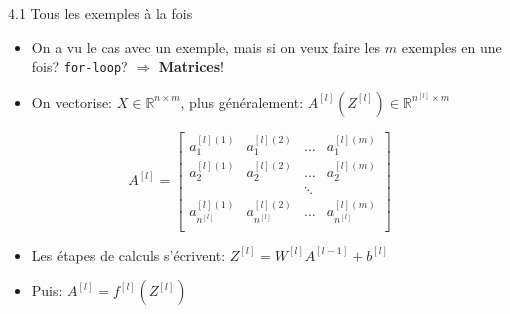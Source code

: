 \begin{frame}{4.1 Tous les exemples à la fois}
  \begin{itemize}
  \item On a vu le cas avec un exemple, mais si on veux faire les $m$ exemples en une fois? \texttt{for-loop}? $\Rightarrow$ \textbf{Matrices}!
  \item On vectorise: $X \in \mathbb{R}^{n \times m}$, plus généralement: $A^{[l]} (Z^{[l]}) \in \mathbb{R}^{n^{[l]} \times m }$
  \end{itemize}
  \begin{equation*}
    A^{[l]} = \begin{bmatrix*} a_{1}^{[l](1)} & a_{1}^{[l](2)} & \dots & a_{1}^{[l](m)}\\ a_{2}^{[l](1)} & a_{2}^{[l](2)} & \dots & a_{2}^{[l](m)}\\ & & \ddots & \\ a_{n^{[l]}}^{[l](1)} & a_{n^{[l]}}^{[l](2)} & \dots & a_{n^{[l]}}^{[l](m)}\\  \end{bmatrix*}
  \end{equation*}
  \begin{itemize}
  \item Les étapes de calculs s'écrivent: \boldmath $Z^{[l]} = W^{[l]} A^{[l-1]} + b^{[l]}$
  \item Puis: \boldmath $A^{[l]} = f^{[l]}(Z^{[l]})$
  \end{itemize}
\end{frame}

